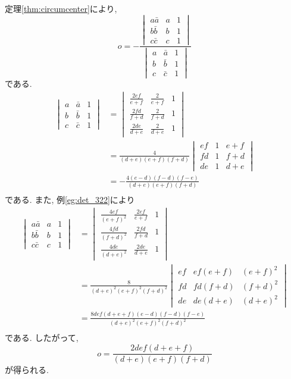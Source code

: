 \begin{prf*}
定理\ref{thm:circumcenter}により,
\[o=-\frac{\begin{vmatrix}a\bar{a}&a&1\\b\bar{b}&b&1\\c\bar{c}&c&1\end{vmatrix}}{\begin{vmatrix}a&\bar{a}&1\\b&\bar{b}&1\\c&\bar{c}&1\end{vmatrix}}\]
である.
\begin{align*}
\begin{vmatrix}a&\bar{a}&1\\b&\bar{b}&1\\c&\bar{c}&1\end{vmatrix}
&=\begin{vmatrix}\frac{2ef}{e+f}&\frac{2}{e+f}&1\\\frac{2fd}{f+d}&\frac{2}{f+d}&1\\\frac{2de}{d+e}&\frac{2}{d+e}&1\end{vmatrix}\\
&=\frac{4}{(d+e)(e+f)(f+d)}\begin{vmatrix}ef&1&e+f\\fd&1&f+d\\de&1&d+e\end{vmatrix}\\
&=-\frac{4(e-d)(f-d)(f-e)}{(d+e)(e+f)(f+d)}\\
\end{align*}
である.
また, 例\ref{eg:det_322}により
\begin{align*}
\begin{vmatrix}a\bar{a}&a&1\\b\bar{b}&b&1\\c\bar{c}&c&1\end{vmatrix}
&=\begin{vmatrix}\frac{4ef}{(e+f)^2}&\frac{2ef}{e+f}&1\\\frac{4fd}{(f+d)^2}&\frac{2fd}{f+d}&1\\\frac{4de}{(d+e)^2}&\frac{2de}{d+e}&1\end{vmatrix}\\
&=\frac{8}{(d+e)^2(e+f)^2(f+d)^2}\begin{vmatrix}ef&ef(e+f)&(e+f)^2\\fd&fd(f+d)&(f+d)^2\\de&de(d+e)&(d+e)^2\end{vmatrix}\\
&=\frac{8def(d+e+f)(e-d)(f-d)(f-e)}{(d+e)^2(e+f)^2(f+d)^2}\\
\end{align*}
である.
したがって,
\[o=\frac{2def(d+e+f)}{(d+e)(e+f)(f+d)}\]
が得られる.
\end{prf*}

